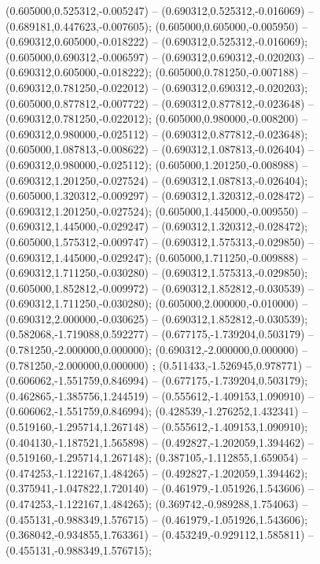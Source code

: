  (0.605000,0.525312,-0.005247) -- (0.690312,0.525312,-0.016069) -- (0.689181,0.447623,-0.007605);
 (0.605000,0.605000,-0.005950) -- (0.690312,0.605000,-0.018222) -- (0.690312,0.525312,-0.016069);
 (0.605000,0.690312,-0.006597) -- (0.690312,0.690312,-0.020203) -- (0.690312,0.605000,-0.018222);
 (0.605000,0.781250,-0.007188) -- (0.690312,0.781250,-0.022012) -- (0.690312,0.690312,-0.020203);
 (0.605000,0.877812,-0.007722) -- (0.690312,0.877812,-0.023648) -- (0.690312,0.781250,-0.022012);
 (0.605000,0.980000,-0.008200) -- (0.690312,0.980000,-0.025112) -- (0.690312,0.877812,-0.023648);
 (0.605000,1.087813,-0.008622) -- (0.690312,1.087813,-0.026404) -- (0.690312,0.980000,-0.025112);
 (0.605000,1.201250,-0.008988) -- (0.690312,1.201250,-0.027524) -- (0.690312,1.087813,-0.026404);
 (0.605000,1.320312,-0.009297) -- (0.690312,1.320312,-0.028472) -- (0.690312,1.201250,-0.027524);
 (0.605000,1.445000,-0.009550) -- (0.690312,1.445000,-0.029247) -- (0.690312,1.320312,-0.028472);
 (0.605000,1.575312,-0.009747) -- (0.690312,1.575313,-0.029850) -- (0.690312,1.445000,-0.029247);
 (0.605000,1.711250,-0.009888) -- (0.690312,1.711250,-0.030280) -- (0.690312,1.575313,-0.029850);
 (0.605000,1.852812,-0.009972) -- (0.690312,1.852812,-0.030539) -- (0.690312,1.711250,-0.030280);
 (0.605000,2.000000,-0.010000) -- (0.690312,2.000000,-0.030625) -- (0.690312,1.852812,-0.030539);
 (0.582068,-1.719088,0.592277) -- (0.677175,-1.739204,0.503179) -- (0.781250,-2.000000,0.000000);
 (0.690312,-2.000000,0.000000) -- (0.781250,-2.000000,0.000000) ;
 (0.511433,-1.526945,0.978771) -- (0.606062,-1.551759,0.846994) -- (0.677175,-1.739204,0.503179);
 (0.462865,-1.385756,1.244519) -- (0.555612,-1.409153,1.090910) -- (0.606062,-1.551759,0.846994);
 (0.428539,-1.276252,1.432341) -- (0.519160,-1.295714,1.267148) -- (0.555612,-1.409153,1.090910);
 (0.404130,-1.187521,1.565898) -- (0.492827,-1.202059,1.394462) -- (0.519160,-1.295714,1.267148);
 (0.387105,-1.112855,1.659054) -- (0.474253,-1.122167,1.484265) -- (0.492827,-1.202059,1.394462);
 (0.375941,-1.047822,1.720140) -- (0.461979,-1.051926,1.543606) -- (0.474253,-1.122167,1.484265);
 (0.369742,-0.989288,1.754063) -- (0.455131,-0.988349,1.576715) -- (0.461979,-1.051926,1.543606);
 (0.368042,-0.934855,1.763361) -- (0.453249,-0.929112,1.585811) -- (0.455131,-0.988349,1.576715);
